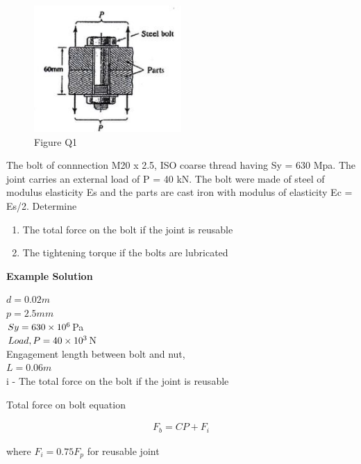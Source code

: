 \documentclass[a4paper, fleqn]{article}
\providecommand{\sci}[1]{\protect\ensuremath{\times 10^{\StrSubstitute[0]{#1}{e}{}}}}
\begin{document}
\begin{figure}[h]
    \centering
    \includegraphics[width=0.5\textwidth]{t31-q1.png}
    \caption{Figure Q1}
\end{figure}

The bolt of connnection M20 x 2.5, ISO coarse thread having Sy = 630 Mpa. The joint carries an external load of P = 40 kN. The bolt were made of steel of modulus elasticity Es and the parts are cast iron with modulus of elasticity Ec = Es/2. Determine

\begin{enumerate}[label=(\roman*)]
    \item The total force on the bolt if the joint is reusable
    \item The tightening torque if the bolts are lubricated
\end{enumerate}

\vspace{10pt}
\textbf{Example Solution}
\vspace{10pt}

$d = 0.02m$\\
$p = 2.5mm$\\
$Sy=630\sci{e6}$Pa\\
$Load,P = 40\sci{e3}$N\\
Engagement length between bolt and nut,\\
$L = 0.06m$\\

i - The total force on the bolt if the joint is reusable

Total force on bolt equation

\begin{equation}
    \begin{aligned}
    F_b=CP+F_i
    \end{aligned}
\end{equation}

where $F_i=0.75F_p$ for reusable joint
\end{document}
